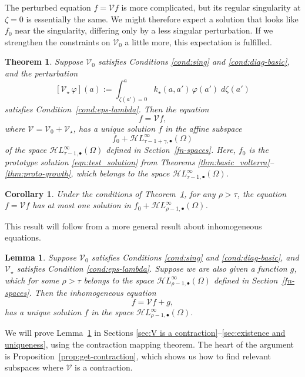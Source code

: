 \documentclass{article}
\theoremstyle{definition}
\theoremstyle{plain}
\newtheorem{lemma}{Lemma}
\newtheorem{theorem}{Theorem}
\newtheorem{corollary}{Corollary}
\newcommand{\singexp}[2]{\mathcal{H}L^\infty_{#1, #2}}
\newcommand{\singexpalg}[1]{\singexp{#1}{\bullet}}
\newcommand{\volterra}{\mathcal{V}}
\newcommand{\hardpart}{\mathcal{V}_0}
\newcommand{\softpart}{\mathcal{V}_\star}
\newcommand{\softker}{k_\star}
\newcommand{\solproto}{f_0}
\newcommand{\domain}{\Omega}
\newenvironment{revtwo}{\color{revred}}{\color{black}}
\newcommand{\revtwotext}[1]{\textcolor{revred}{#1}}
\newenvironment{revtwo}{}{}
\newcommand{\revtwotext}[1]{#1}
\begin{document}
The perturbed equation $f = \volterra f$ is more complicated, but its regular singularity at $\zeta = 0$ is essentially the same. We might therefore expect a solution that looks like $\solproto$ near the singularity, differing only by a less singular perturbation. If we strengthen the constraints on $\hardpart$ a little more, this expectation is fulfilled.
\begin{theorem}\label{thm:general_volterra}
Suppose $\hardpart$ satisfies {\em Conditions \eqref{cond:sing}} and \eqref{cond:diag-basic}, and \begin{revtwo}the perturbation
\[ [\softpart\,\varphi](a) := \int_{\zeta(a') = 0}^a \softker(a, a')\,\varphi(a')\;d\zeta(a') \]
\end{revtwo}
satisfies {\em Condition~\eqref{cond:eps-lambda}}. Then the equation
\[ f = \volterra f, \]
\revtwotext{where $\volterra = \hardpart + \softpart$,} has a unique solution $f$ in the affine subspace
\[ f_0 + \singexpalg{\tau-1+\gamma}(\Omega) \]
of the space $\singexpalg{\tau-1}(\Omega)$ defined in Section~\ref{fn-spaces}. Here, $f_0$ is the prototype solution \eqref{eqn:test_solution} from Theorems \ref{thm:basic_volterra}--\ref{thm:proto-growth}, which belongs to the space $\singexpalg{\tau-1}(\domain)$.
\end{theorem}
\begin{corollary}\label{cor:expand_uniq}
Under the conditions of Theorem~\ref{thm:general_volterra}, for any $\rho > \tau$, the equation $f = \volterra f$ has at most one solution in $f_0 + \singexpalg{\rho-1}(\Omega)$. 
\end{corollary}
This result will follow from a more general result about inhomogeneous equations.
\begin{lemma}\label{lem:perturbed_volterra}
Suppose $\hardpart$ satisfies {\em Conditions \eqref{cond:sing}} and \eqref{cond:diag-basic}, and $\softpart$ satisfies {\em Condition \eqref{cond:eps-lambda}}. Suppose we are also given a function $g$, which for some $\rho > \tau$ belongs to the space $\singexpalg{\rho-1}(\Omega)$ defined in Section~\ref{fn-spaces}. Then the inhomogeneous equation
\[ f = \volterra f + g, \]
has a unique solution $f$ in the space $\singexpalg{\rho-1}(\Omega)$.
\end{lemma}
We will prove Lemma~\ref{lem:perturbed_volterra} in Sections \ref{sec:V is a contraction}--\ref{sec:existence and uniqueness}, using the contraction mapping theorem. The heart of the argument is Proposition~\ref{prop:get-contraction}, which shows us how to find relevant subspaces where $\volterra$ is a contraction.
\end{document}
